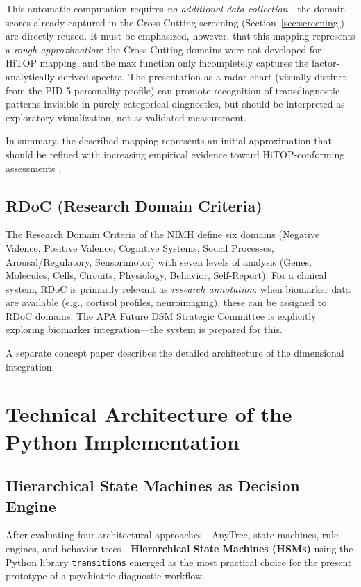 \documentclass[11pt,a4paper]{article}
\begin{document}
This automatic computation requires \textit{no additional data collection}---the domain scores already captured in the Cross-Cutting screening (Section~\ref{sec:screening}) are directly reused. It must be emphasized, however, that this mapping represents a \textit{rough approximation}: the Cross-Cutting domains were not developed for HiTOP mapping, and the max function only incompletely captures the factor-analytically derived spectra. The presentation as a radar chart (visually distinct from the PID-5 personality profile) can promote recognition of transdiagnostic patterns invisible in purely categorical diagnostics, but should be interpreted as exploratory visualization, not as validated measurement.

In summary, the described mapping represents an initial approximation that should be refined with increasing empirical evidence toward HiTOP-conforming assessments \citep{Kotov2021}.

\subsection{RDoC (Research Domain Criteria)}

The Research Domain Criteria of the NIMH \citep{Insel2010} define six domains (Negative Valence, Positive Valence, Cognitive Systems, Social Processes, Arousal/Regulatory, Sensorimotor) with seven levels of analysis (Genes, Molecules, Cells, Circuits, Physiology, Behavior, Self-Report). For a clinical system, RDoC is primarily relevant as \textit{research annotation}: when biomarker data are available (e.g., cortisol profiles, neuroimaging), these can be assigned to RDoC domains. The APA Future DSM Strategic Committee is explicitly exploring biomarker integration---the system is prepared for this.

A separate concept paper describes the detailed architecture of the dimensional integration.

\section{Technical Architecture of the Python Implementation}
\label{sec:technik}

\subsection{Hierarchical State Machines as Decision Engine}

After evaluating four architectural approaches---AnyTree, state machines, rule engines, and behavior trees---\textbf{Hierarchical State Machines (HSMs)} using the Python library \texttt{transitions} emerged as the most practical choice for the present prototype of a psychiatric diagnostic workflow.
\end{document}
